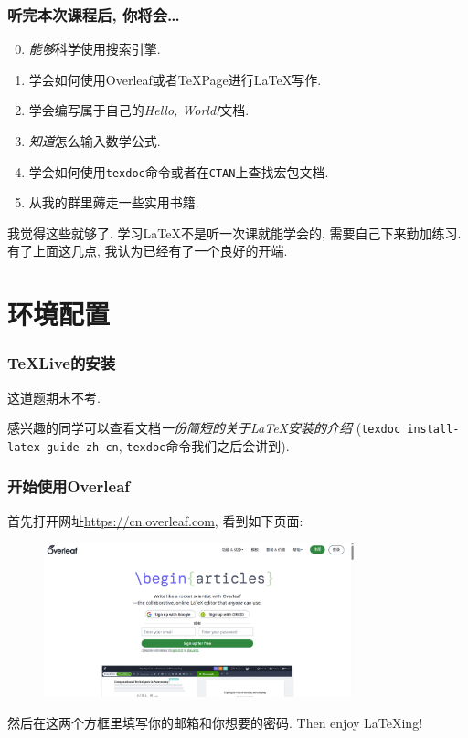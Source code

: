 \documentclass{beamer}
\begin{document}
\begin{frame}
    \frametitle{听完本次课程后, 你将会\dots}
    \begin{enumerate}[(1)]
        \setcounter{enumi}{-1}
        \item \emph{能够}科学使用搜索引擎.
        \item 学会如何使用Overleaf或者\TeX{}Page进行\LaTeX{}写作.
        \item 学会编写属于自己的\emph{Hello, World!}文档.
        \item \emph{知道}怎么输入数学公式.
        \item 学会如何使用\Verb|texdoc|命令或者在\Verb|CTAN|上查找宏包文档.
        \item 从我的群里薅走一些实用书籍.
    \end{enumerate}\pause
    我觉得这些就够了.
    学习\LaTeX{}不是听一次课就能学会的, 需要自己下来勤加练习.
    有了上面这几点, 我认为已经有了一个良好的开端.
\end{frame}

\section{环境配置}

\begin{frame}
    \frametitle{\TeX{}Live的安装}
    这道题期末不考.

    感兴趣的同学可以查看文档\emph{一份简短的关于\LaTeX{}安装的介绍} (\Verb|texdoc install-latex-guide-zh-cn|, \Verb|texdoc|命令我们之后会讲到).
\end{frame}

\begin{frame}
    \frametitle{开始使用Overleaf}
    首先打开网址\url{https://cn.overleaf.com}, 看到如下页面:
    \begin{figure}[h]
        \centering
        \includegraphics[width=0.8\textwidth]{figure/overleaf-signin.png}
    \end{figure}\pause
    然后在这两个方框里填写你的邮箱和你想要的密码.
    Then enjoy \LaTeX{ing}!
\end{frame}
\end{document}
